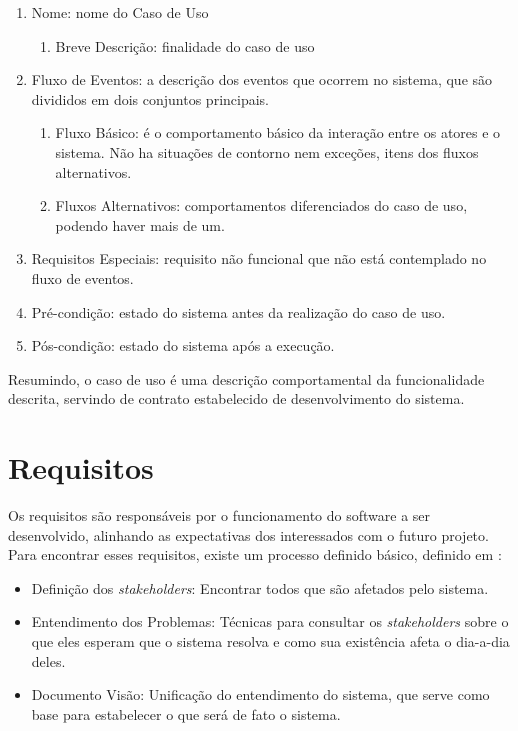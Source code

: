\begin{enumerate}
    \item Nome: nome do Caso de Uso
    \begin{enumerate}
        \item Breve Descrição: finalidade do caso de uso
    \end{enumerate}
    \item Fluxo de Eventos: a descrição dos eventos que ocorrem no sistema, que são divididos em dois conjuntos principais.
    \begin{enumerate}
        \item Fluxo Básico: é o comportamento básico da interação entre os atores e o sistema. Não ha situações de contorno nem exceções, itens dos fluxos alternativos.
        \item Fluxos Alternativos: comportamentos diferenciados do caso de uso, podendo haver mais de um.
    \end{enumerate}
    \item Requisitos Especiais: requisito não funcional que não está contemplado no fluxo de eventos.
    \item Pré-condição: estado do sistema antes da realização do caso de uso.
    \item Pós-condição: estado do sistema após a execução.
\end{enumerate}

Resumindo, o caso de uso é uma descrição comportamental da funcionalidade descrita, servindo de contrato estabelecido de desenvolvimento do sistema.

\section{Requisitos}
Os requisitos são responsáveis por o funcionamento do software a ser desenvolvido, alinhando as expectativas dos interessados com o futuro projeto. Para encontrar esses requisitos, existe um processo definido básico, definido em \cite{kurtbittnerianspence2002}:

\begin{itemize}
    \item Definição dos \textit{stakeholders}: Encontrar todos que são afetados pelo sistema.
    \item Entendimento dos Problemas: Técnicas para consultar os \textit{stakeholders} sobre o que eles esperam que o sistema resolva e como sua existência afeta o dia-a-dia deles.
    \item Documento Visão: Unificação do entendimento do sistema, que serve como base para estabelecer o que será de fato o sistema.
\end{itemize}

